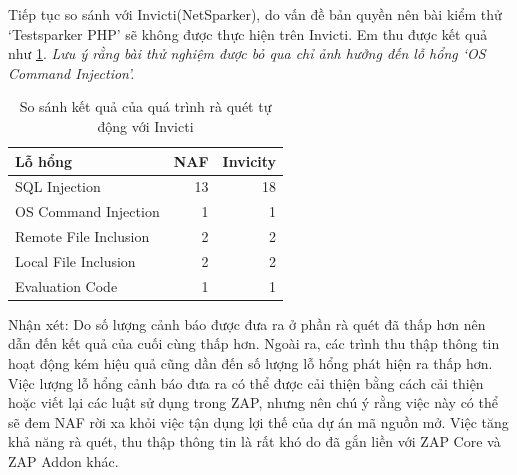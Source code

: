 \documentclass[./../main.tex]{subfiles}
\begin{document}
Tiếp tục so sánh với Invicti(NetSparker), do vấn đề bản quyền nên bài kiểm thử `Testsparker PHP' sẽ không được thực hiện trên Invicti. Em thu được kết quả như \ref{tb:diff}. \textit{Lưu ý rằng bài thử nghiệm được bỏ qua chỉ ảnh hưởng đến lỗ hổng `OS Command Injection'.}

\begin{table}[ht!]
	\begin{tabular}{|l|r|r|}
		\hline
		\textbf{Lỗ hổng}      & \multicolumn{1}{l|}{\textbf{NAF}} & \multicolumn{1}{l|}{\textbf{Invicity}} \\ \hline
		SQL Injection         & 13                                & 18                                     \\ \hline
		OS Command Injection  & 1                                 & 1                                      \\ \hline
		Remote File Inclusion & 2                                 & 2                                      \\ \hline
		Local File Inclusion  & 2                                 & 2                                      \\ \hline
		Evaluation Code       & 1                                 & 1                                      \\ \hline
	\end{tabular}
	\caption{So sánh kết quả của quá trình rà quét tự động với Invicti}
	\label{tb:diff}
\end{table}

Nhận xét: Do số lượng cảnh báo được đưa ra ở phần rà quét đã thấp hơn nên dẫn đến kết quả của cuối cùng thấp hơn. Ngoài ra, các trình thu thập thông tin hoạt động kém hiệu quả cũng dần đến số lượng lỗ hổng phát hiện ra thấp hơn. Việc lượng lỗ hổng cảnh báo đưa ra có thể được cải thiện bằng cách cải thiện hoặc viết lại các luật sử dụng trong ZAP, nhưng nên chú ý rằng việc này có thể sẽ đem NAF rời xa khỏi việc tận dụng lợi thế của dự án mã nguồn mở. Việc tăng khả năng rà quét, thu thập thông tin là rất khó do đã gắn liền với ZAP Core và ZAP Addon khác.
\end{document}
